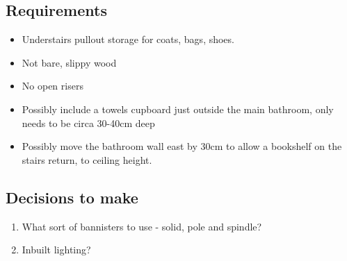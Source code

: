\subsection{Requirements}
\begin{itemize}
\item Understairs pullout storage for coats, bags, shoes.
\item Not bare, slippy wood
\item No open risers
\item Possibly include a towels cupboard just outside the main bathroom, only needs to be circa 30-40cm deep
\item Possibly move the bathroom wall east by 30cm to allow a bookshelf on the stairs return, to ceiling height.
\end{itemize}

\subsection{Decisions to make}
\begin{enumerate}
\item What sort of bannisters to use - solid, pole and spindle?
\item Inbuilt lighting? 
\end{enumerate}
